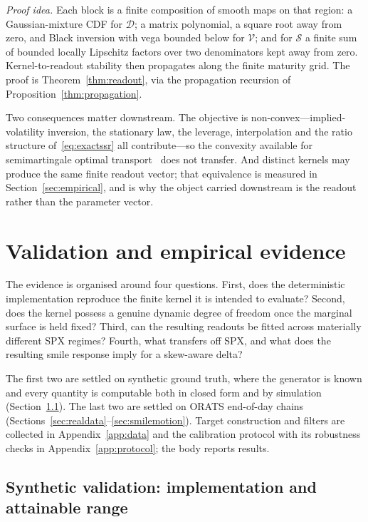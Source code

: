 \documentclass[11pt]{article}
\providecommand{\1}{\mathbf 1}
\begin{document}
\noindent \emph{Proof idea.} Each block is a finite composition of smooth maps on that region: a
Gaussian-mixture CDF for $\mathcal D$; a matrix polynomial, a square root away from zero, and Black
inversion with vega bounded below for $\mathcal V$; and for $\mathcal S$ a finite sum of bounded
locally Lipschitz factors over two denominators kept away from zero. Kernel-to-readout stability
then propagates along the finite maturity grid. The proof is Theorem~\ref{thm:readout}, via the
propagation recursion of Proposition~\ref{thm:propagation}.

Two consequences matter downstream. The objective is non-convex---implied-volatility inversion, the
stationary law, the leverage, interpolation and the ratio structure of~\eqref{eq:exactssr} all
contribute---so the convexity available for semimartingale optimal
transport~\cite{guo2022ot,backhoff2020} does not transfer. And distinct kernels may produce the same
finite readout vector; that equivalence is measured in Section~\ref{sec:empirical}, and is why the
object carried downstream is the readout rather than the parameter vector.

\section{Validation and empirical evidence}
\label{sec:experiments}\label{sec:empirical}

The evidence is organised around four questions. First, does the deterministic implementation
reproduce the finite kernel it is intended to evaluate? Second, does the kernel possess a genuine
dynamic degree of freedom once the marginal surface is held fixed? Third, can the resulting readouts
be fitted across materially different SPX regimes? Fourth, what transfers off SPX, and what does the
resulting smile response imply for a skew-aware delta?

The first two are settled on synthetic ground truth, where the generator is known and every quantity
is computable both in closed form and by simulation (Section~\ref{sec:synth}). The last two are
settled on ORATS end-of-day chains (Sections~\ref{sec:realdata}--\ref{sec:smilemotion}). Target
construction and filters are collected in Appendix~\ref{app:data} and the calibration protocol with
its robustness checks in Appendix~\ref{app:protocol}; the body reports results.

\subsection{Synthetic validation: implementation and attainable range}
\label{sec:synth}
\end{document}
